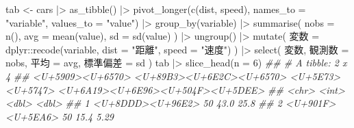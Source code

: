 \documentclass[
  letterpaper,
  xelatex,
  ja=standard, xelatex]{bxjsbook}
\newenvironment{Shaded}{\begin{snugshade}}{\end{snugshade}}
\newcommand{\AttributeTok}[1]{\textcolor[rgb]{0.40,0.45,0.13}{#1}}
\newcommand{\DecValTok}[1]{\textcolor[rgb]{0.68,0.00,0.00}{#1}}
\newcommand{\DocumentationTok}[1]{\textcolor[rgb]{0.37,0.37,0.37}{\textit{#1}}}
\newcommand{\FunctionTok}[1]{\textcolor[rgb]{0.28,0.35,0.67}{#1}}
\newcommand{\NormalTok}[1]{\textcolor[rgb]{0.00,0.23,0.31}{#1}}
\newcommand{\OtherTok}[1]{\textcolor[rgb]{0.00,0.23,0.31}{#1}}
\newcommand{\SpecialCharTok}[1]{\textcolor[rgb]{0.37,0.37,0.37}{#1}}
\newcommand{\StringTok}[1]{\textcolor[rgb]{0.13,0.47,0.30}{#1}}
\begin{document}
\begin{Shaded}
\begin{Highlighting}[]
\NormalTok{tab }\OtherTok{\textless{}{-}}\NormalTok{ cars }\SpecialCharTok{|\textgreater{}} 
  \FunctionTok{as\_tibble}\NormalTok{() }\SpecialCharTok{|\textgreater{}} 
  \FunctionTok{pivot\_longer}\NormalTok{(}\FunctionTok{c}\NormalTok{(dist, speed), }\AttributeTok{names\_to =} \StringTok{"variable"}\NormalTok{, }\AttributeTok{values\_to =} \StringTok{"value"}\NormalTok{) }\SpecialCharTok{|\textgreater{}} 
  \FunctionTok{group\_by}\NormalTok{(variable) }\SpecialCharTok{|\textgreater{}}
  \FunctionTok{summarise}\NormalTok{(}
    \AttributeTok{nobs =} \FunctionTok{n}\NormalTok{(),}
    \AttributeTok{avg  =} \FunctionTok{mean}\NormalTok{(value),}
    \AttributeTok{sd   =} \FunctionTok{sd}\NormalTok{(value)}
\NormalTok{  ) }\SpecialCharTok{|\textgreater{}}
  \FunctionTok{ungroup}\NormalTok{() }\SpecialCharTok{|\textgreater{}}
  \FunctionTok{mutate}\NormalTok{(}
    \StringTok{\textasciigrave{}}\AttributeTok{変数}\StringTok{\textasciigrave{}} \OtherTok{=}\NormalTok{ dplyr}\SpecialCharTok{::}\FunctionTok{recode}\NormalTok{(variable, }\AttributeTok{dist =} \StringTok{"距離"}\NormalTok{, }\AttributeTok{speed =} \StringTok{"速度"}\NormalTok{)}
\NormalTok{  ) }\SpecialCharTok{|\textgreater{}}
  \FunctionTok{select}\NormalTok{(}
    \StringTok{\textasciigrave{}}\AttributeTok{変数}\StringTok{\textasciigrave{}}\NormalTok{,}
    \StringTok{\textasciigrave{}}\AttributeTok{観測数}\StringTok{\textasciigrave{}}   \OtherTok{=}\NormalTok{ nobs,}
    \StringTok{\textasciigrave{}}\AttributeTok{平均}\StringTok{\textasciigrave{}}     \OtherTok{=}\NormalTok{ avg,}
    \StringTok{\textasciigrave{}}\AttributeTok{標準偏差}\StringTok{\textasciigrave{}} \OtherTok{=}\NormalTok{ sd}
\NormalTok{  )}
\NormalTok{tab }\SpecialCharTok{|\textgreater{}} \FunctionTok{slice\_head}\NormalTok{(}\AttributeTok{n =} \DecValTok{6}\NormalTok{)}
\DocumentationTok{\#\# \# A tibble: 2 x 4}
\DocumentationTok{\#\#   \textasciigrave{}\textless{}U+5909\textgreater{}\textless{}U+6570\textgreater{}\textasciigrave{}           \textasciigrave{}\textless{}U+89B3\textgreater{}\textless{}U+6E2C\textgreater{}\textless{}U+6570\textgreater{}\textasciigrave{} \textasciigrave{}\textless{}U+5E73\textgreater{}\textless{}U+5747\textgreater{}\textasciigrave{} \textasciigrave{}\textless{}U+6A19\textgreater{}\textless{}U+6E96\textgreater{}\textless{}U+504F\textgreater{}\textless{}U+5DEE\textgreater{}\textasciigrave{}}
\DocumentationTok{\#\#   \textless{}chr\textgreater{}               \textless{}int\textgreater{}  \textless{}dbl\textgreater{}      \textless{}dbl\textgreater{}}
\DocumentationTok{\#\# 1 \textless{}U+8DDD\textgreater{}\textless{}U+96E2\textgreater{}       50   43.0      25.8 }
\DocumentationTok{\#\# 2 \textless{}U+901F\textgreater{}\textless{}U+5EA6\textgreater{}       50   15.4       5.29}
\end{Highlighting}
\end{Shaded}
\end{document}
